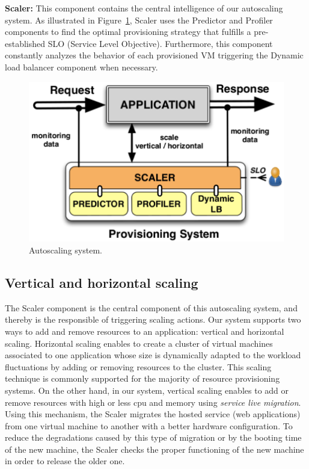 \vspace{2mm}

\textbf{Scaler:} This component contains the central intelligence of our autoscaling system. As illustrated in Figure~\ref{autoScalingSys}, Scaler uses the Predictor and Profiler components to find the optimal provisioning strategy that fulfills a pre-established SLO (Service Level Objective). Furthermore, this component constantly analyzes the behavior of each provisioned VM triggering the Dynamic load balancer component when necessary.

\begin{figure}[htb]
  \begin{center}
    \includegraphics[width=.85\linewidth]{images/monitoringSchema}
  \end{center}
\vspace{-5mm}
  \caption{Autoscaling system.}
  \label{autoScalingSys}
\end{figure}


\subsection{Vertical and horizontal scaling}
The Scaler component is the central component of this autoscaling system, and thereby is the responsible of triggering scaling actions. Our system supports two ways to add and remove resources to an application: vertical and horizontal scaling. Horizontal scaling enables to create a cluster of virtual machines associated to one application whose size is dynamically adapted to the workload fluctuations by adding or removing resources to the cluster. This scaling technique is commonly supported for the majority of resource provisioning systems. On the other hand, in our system, vertical scaling enables to add or remove resources with high or less cpu and memory using \emph{service live migration}. Using this mechanism, the Scaler migrates the hosted service (web applications) from one virtual machine to another with a better hardware configuration. To reduce the degradations caused by this type of migration or by the booting time of the new machine, the Scaler checks the proper functioning of the new machine in order to release the older one.


